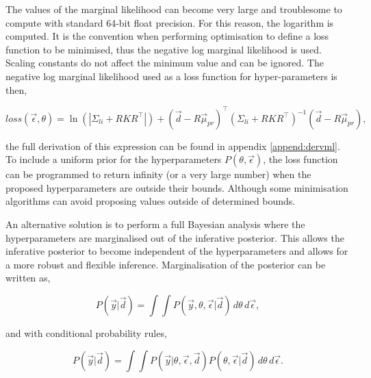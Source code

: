 \noindent The values of the marginal likelihood can become very large and troublesome to compute with standard 64-bit float precision. For this reason, the logarithm is computed. It is the convention when performing optimisation to define a loss function to be minimised, thus the negative log marginal likelihood is used. Scaling constants do not affect the minimum value and can be ignored. The negative log marginal likelihood used as a loss function for hyper-parameters is then,

\begin{equation}
loss(\vec \epsilon,\theta) = \ln(|\Sigma_{li}+RKR^\top|) +  (\vec{d} - R\vec{\mu}_{pr})^{\top} (\Sigma_{li} + R K R^{\top})^{-1} (\vec{d} - R\vec{\mu}_{pr}),
\label{eq:loss}
\end{equation}

\noindent the full derivation of this expression can be found in appendix \ref{append:dervml}. To include a uniform prior for the hyperparameters $P(\theta, \vec{\epsilon})$, the loss function can be programmed to return infinity (or a very large number) when the proposed hyperparameters are outside their bounds. Although some minimisation algorithms can avoid proposing values outside of determined bounds.

An alternative solution is to perform a full Bayesian analysis where the hyperparameters are marginalised out of the inferative posterior. This allows the inferative posterior to become independent of the hyperparameters and allows for a more robust and flexible inference. Marginalisation of the posterior can be written as,

\begin{equation} 
  P(\vec{y}|\vec{d}) = \int \int P(\vec y, \theta, \vec \epsilon|\vec d) \, d\theta \, d\vec \epsilon ,
\end{equation}

and with conditional probability rules,

\begin{equation}
  P(\vec{y}|\vec{d}) = \int \int P(\vec y | \theta, \vec \epsilon, \vec d) P(\theta, \vec \epsilon|\vec d) \, d\theta \, d\vec \epsilon.
\end{equation}

